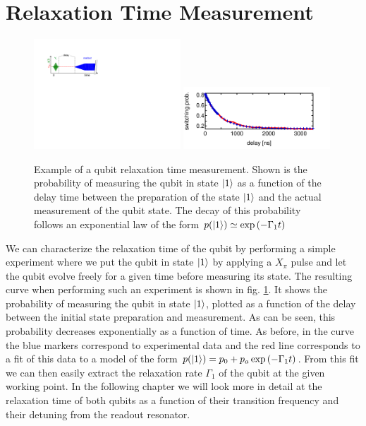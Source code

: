 \section{Relaxation Time Measurement}

\begin{figure}[ht!]
\centering
\includegraphics[width=0.49\textwidth]{"./material/figures/measurement/qubit_t1_measurement"}
\includegraphics[width=0.49\textwidth]{"./data/ct5/2011_04_21 - grover and tomo/example - qubit 2 t1"}
\caption[]{Example of a qubit relaxation time measurement. Shown is the probability of measuring the qubit in state $\left| 1 \right>$ as a function of the delay time between the preparation of the state $\left| 1 \right>$ and the actual measurement of the qubit state. The decay of this probability follows an exponential law of the form $p(\left| 1 \right>)\simeq\exp{(-\Gamma_1 t)}$}
\label{fig:qubit_t1_example}
\end{figure}

We can characterize the relaxation time of the qubit by performing a simple experiment where we put the qubit in state $\left| 1 \right>$ by applying a $X_{\pi}$ pulse and let the qubit evolve freely for a given time before measuring its state. The resulting curve when performing such an experiment is shown in fig. \ref{fig:qubit_t1_example}. It shows the probability of measuring the qubit in state $\left| 1 \right>$, plotted as a function of the delay between the initial state preparation and measurement. As can be seen, this probability decreases exponentially as a function of time. As before, in the curve the blue markers correspond to experimental data and the red line corresponds to a fit of this data to a model of the form $p(\left| 1 \right>) = p_0+p_a\exp{(-\Gamma_1 t)}$. From this fit we can then easily extract the relaxation rate $\Gamma_1$ of the qubit at the given working point. In the following chapter we will look more in detail at the relaxation time of both qubits as a function of their transition frequency and their detuning from the readout resonator.



